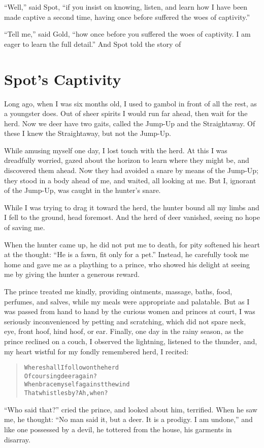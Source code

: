 \documentclass[article, twoside, 14pt]{memoir}
\renewenvironment{verbatim}{%
\begin{quote}%
\vskip -10pt%
\begin{alltt}\normalfont\large}{\end{alltt}%
\end{quote}%
\vskip -10pt
} %
\begin{document}
``Well,'' said Spot,
``if you insist on knowing, listen, and learn how I have been made captive a second time, having once before suffered the woes of captivity.''

``Tell me,'' said Gold,
``how once before you suffered the woes of captivity. I am eager to learn the full detail.''
And Spot told the story of

\chapter{Spot's Captivity}

\label{s45}

Long ago, when I was six months old, I used to gambol in front of
all the rest, as a youngster does. Out of sheer spirits I would run
far ahead, then wait for the herd. Now we deer have two gaits,
called the Jump-Up and the Straightaway. Of these I knew the
Straightaway, but not the Jump-Up.

While amusing myself one day, I lost touch with the herd. At this I
was dreadfully worried, gazed about the horizon to learn where they
might be, and discovered them ahead. Now they had avoided a snare
by means of the Jump-Up; they stood in a body ahead of me, and
waited, all looking at me. But I, ignorant of the Jump-Up,
was caught in the hunter's snare.

While I was trying to drag it toward the herd, the hunter bound all
my limbs and I fell to the ground, head foremost. And the herd of
deer vanished, seeing no hope of saving me.

When the hunter came up, he did not put me to death, for pity
softened his heart at the thought:
``He is a fawn, fit only for a pet.'' Instead, he carefully took me
home and gave me as a plaything to a prince, who showed his delight
at seeing me by giving the hunter a generous reward.

The prince treated me kindly, providing ointments, massage, baths,
food, perfumes, and salves, while my meals were appropriate and
palatable. But as I was passed from hand to hand by the curious
women and princes at court, I was seriously inconvenienced by
petting and scratching, which did not spare neck, eye, front hoof,
hind hoof, or ear. Finally, one day in the rainy season, as the
prince reclined on a couch, I observed the lightning, listened to
the thunder, and, my heart wistful for my fondly remembered herd, I
recited:

\begin{verbatim}
Where shall I follow on the herd
    Of coursing deer again?
When brace myself against the wind
    That whistles by? Ah, when?
\end{verbatim}
``Who said that?'' cried the prince, and looked about him,
terrified. When he saw me, he thought:
``No man said it, but a deer. It is a prodigy. I am undone,'' and
like one possessed by a devil, he tottered from the house, his
garments in disarray.
\end{document}
